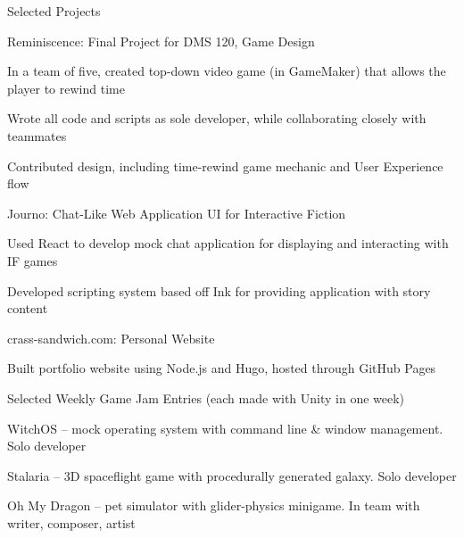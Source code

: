 \documentclass{resume} %
\begin{document}

\begin{rSection}{Selected Projects}

\begin{rProject}{Reminiscence: Final Project for DMS 120, Game Design}
\item In a team of five, created top-down video game (in GameMaker) that allows the player to rewind time
\item Wrote all code and scripts as sole developer, while collaborating closely with teammates
\item Contributed design, including time-rewind game mechanic and User Experience flow
\end{rProject}

\begin{rProject}{Journo: Chat-Like Web Application UI for Interactive Fiction}
\item Used React to develop mock chat application for displaying and interacting with IF games
\item Developed scripting system based off Ink for providing application with story content
\end{rProject}

\begin{rProject}{crass-sandwich.com: Personal Website}
\item Built portfolio website using Node.js and Hugo, hosted through GitHub Pages
\end{rProject}

\begin{rProject}{Selected Weekly Game Jam Entries (each made with Unity in one week)}
\item WitchOS – mock operating system with command line \& window management. Solo developer
\item Stalaria – 3D spaceflight game with procedurally generated galaxy. Solo developer
\item Oh My Dragon – pet simulator with glider-physics minigame. In team with writer, composer, artist
\end{rProject}
\end{rSection}
\end{document}
